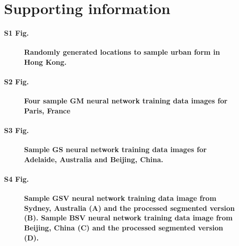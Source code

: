 \documentclass[10pt,letterpaper]{article}
\begin{document}
\section*{Supporting information}

\paragraph*{S1 Fig.}
\begin{figure}[!htbp] 
\centering    
\caption{\bf Randomly generated locations to sample urban form in Hong Kong.} 
\label{fig:hongkong}  
\end{figure}


\paragraph*{S2 Fig.}
\begin{figure}[!htbp]
    \centering    
\caption{\bf Four sample GM neural network training data images for Paris, France \cite{GoogleStatic2017}}    
 \label{fig:maps}  
\end{figure} 


\paragraph*{S3 Fig.}
\begin{figure}[!htbp]
\centering 
\caption{\bf Sample GS neural network training data images for Adelaide, Australia and Beijing, China. \cite{GoogleStatic2017}}    
 \label{fig:satbeiade}  
\end{figure} 



\paragraph*{S4 Fig.}
\begin{figure}[!htbp]
\caption{\bf Sample GSV neural network training data image from Sydney, Australia \cite{GoogleMaps2017b} (A) and the processed segmented version (B). Sample BSV neural network training data image from Beijing, China \cite{Baidu2017} (C) and the processed segmented version (D).}    
 \label{fig:gsvbsv}  
\end{figure} 
\end{document}
